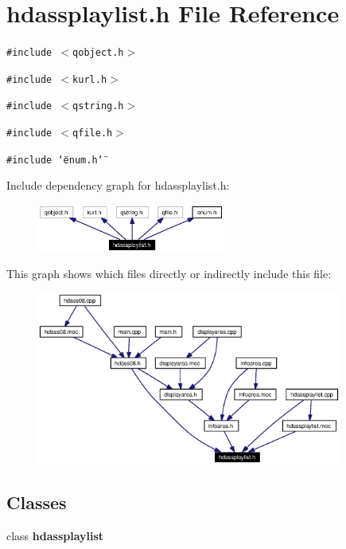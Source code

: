 \section{hdassplaylist.h File Reference}
\label{hdassplaylist_8h}


{\tt \#include $<$qobject.h$>$}\par
{\tt \#include $<$kurl.h$>$}\par
{\tt \#include $<$qstring.h$>$}\par
{\tt \#include $<$qfile.h$>$}\par
{\tt \#include \char`\"{}enum.h\char`\"{}}\par


Include dependency graph for hdassplaylist.h:\begin{figure}[H]
\begin{center}
\leavevmode
\includegraphics[width=175pt]{hdassplaylist_8h__incl}
\end{center}
\end{figure}


This graph shows which files directly or indirectly include this file:\begin{figure}[H]
\begin{center}
\leavevmode
\includegraphics[width=284pt]{hdassplaylist_8h__dep__incl}
\end{center}
\end{figure}
\subsection*{Classes}
\begin{CompactItemize}
\item 
class {\bf hdassplaylist}
\end{CompactItemize}
